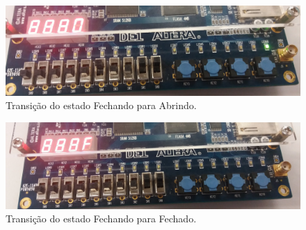 		\begin{figure}[H]
			\includegraphics[width=1\textwidth]{img/maquina/placa/Fechando-Abrindo}
			\caption{Transição do estado Fechando para Abrindo.\label{figura:deployMaquina6}}
		\end{figure}

		\begin{figure}[H]
			\includegraphics[width=1\textwidth]{img/maquina/placa/Fechando-Fechado}
			\caption{Transição do estado Fechando para Fechado.\label{figura:deployMaquina7}}
		\end{figure}


